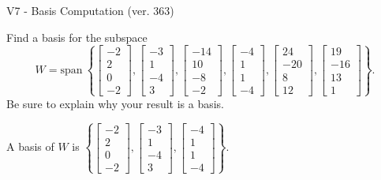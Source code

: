 \begin{exercise}
  \begin{exerciseTitle}V7 - Basis Computation (ver. 363)\end{exerciseTitle}
  \begin{exerciseStatement}
    Find a basis for the subspace 
\[W=\mathrm{span}\ \left\{\left[\begin{array}{r}
-2 \\
2 \\
0 \\
-2
\end{array}\right] , \left[\begin{array}{r}
-3 \\
1 \\
-4 \\
3
\end{array}\right] , \left[\begin{array}{r}
-14 \\
10 \\
-8 \\
-2
\end{array}\right] , \left[\begin{array}{r}
-4 \\
1 \\
1 \\
-4
\end{array}\right] , \left[\begin{array}{r}
24 \\
-20 \\
8 \\
12
\end{array}\right] , \left[\begin{array}{r}
19 \\
-16 \\
13 \\
1
\end{array}\right]\right\}.\]
 Be sure to explain why your result is a basis.


  \end{exerciseStatement}
  \begin{exerciseAnswer}
   A basis of \(W\) is  \(\left\{\left[\begin{array}{r}
-2 \\
2 \\
0 \\
-2
\end{array}\right] , \left[\begin{array}{r}
-3 \\
1 \\
-4 \\
3
\end{array}\right] , \left[\begin{array}{r}
-4 \\
1 \\
1 \\
-4
\end{array}\right]\right\}\).
  


  \end{exerciseAnswer}
\end{exercise}